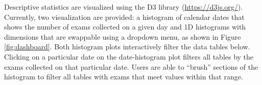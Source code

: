 Descriptive statistics are visualized using the D3 library (\href{https://d3js.org/}{https://d3js.org/}). Currently, two visualization are provided: a histogram of calendar dates that shows the number of exams collected on a given day and 1D histograms with dimensions that are swappable using a dropdown menu, as shown in Figure \ref{fig:dashboard}. Both histogram plots interactively filter the data tables below. Clicking on a particular date on the date-histogram plot filters all tables by the exams collected on that particular date. Users are able to ``brush'' sections of the histogram to filter all tables with exams that meet values within that range.  